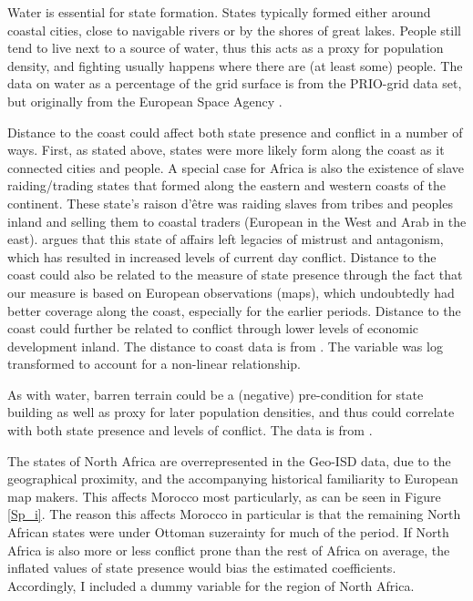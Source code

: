 \documentclass[12pt]{article}
\begin{document}
Water is essential for state formation. States typically formed either around
coastal cities, close to navigable rivers or by the shores of great lakes.
People still tend to live next to a source of water, thus this acts as a proxy
for population density, and fighting usually happens where there are (at least
some) people. The data on water as a percentage of the grid surface is from the
PRIO-grid data set, but originally from the European Space Agency
\citep{Bontemps2009}.

Distance to the coast could affect both state presence and conflict in a number
of ways. First, as stated above, states were more likely form along the coast as
it connected cities and people. A special case for Africa is also the existence
of slave raiding/trading states that formed along the eastern and western coasts
of the continent. These state's raison d'être was raiding slaves from tribes and
peoples inland and selling them to coastal traders (European in the West and
Arab in the east). \citet{Nunn2008} argues that this state of affairs left
legacies of mistrust and antagonism, which has resulted in increased levels of
current day conflict. Distance to the coast could also be related to the measure
of state presence through the fact that our measure is based on European
observations (maps), which undoubtedly had better coverage along the coast,
especially for the earlier periods. Distance to the coast could further be
related to conflict through lower levels of economic development inland. The
distance to coast data is from \citet{Wessel1996}. The variable was log
transformed to account for a non-linear relationship.

As with water, barren terrain could be a (negative) pre-condition for state
building as well as proxy for later population densities, and thus could
correlate with both state presence and levels of conflict. The data is from
\citet{Bontemps2009}.

The states of North Africa are overrepresented in the Geo-ISD data, due to the
geographical proximity, and the accompanying historical familiarity to European
map makers. This affects Morocco most particularly, as can be seen in Figure
\ref{Sp_i}. The reason this affects Morocco in particular is that the remaining
North African states were under Ottoman suzerainty for much of the period. If
North Africa is also more or less conflict prone than the rest of Africa on
average, the inflated values of state presence would bias the estimated
coefficients. Accordingly, I included a dummy variable for the region of North
Africa.
\end{document}
